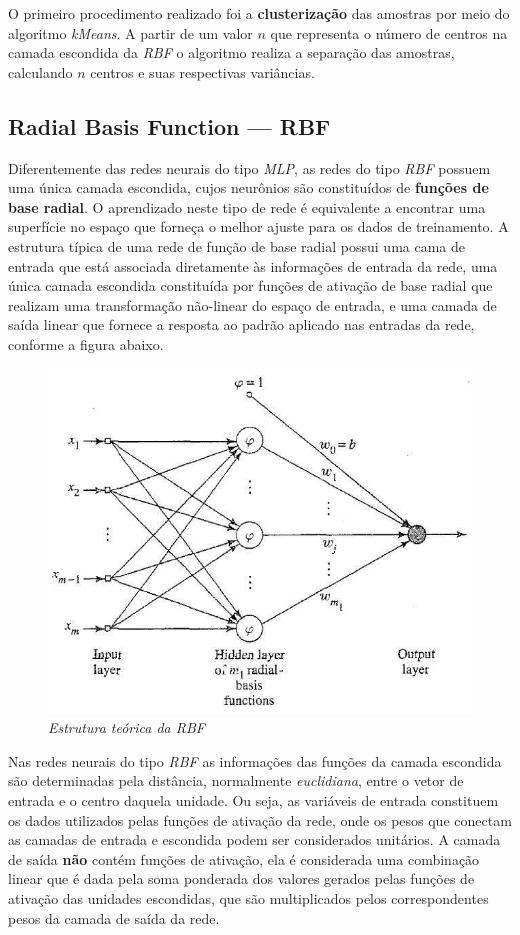 \documentclass[10pt,twocolumn,letterpaper]{article}
\begin{document}
O primeiro procedimento realizado foi a \textbf{clusterização} das amostras por meio do algoritmo \textit{kMeans}. A partir de um valor $n$ que representa o número de centros na camada escondida da \textit{RBF} o algoritmo realiza a separação das amostras, calculando $n$ centros e suas respectivas variâncias.

\subsection{Radial Basis Function --- RBF}
Diferentemente das redes neurais do tipo \textit{MLP}, as redes do tipo \textit{RBF} possuem uma única camada escondida, cujos neurônios são constituídos de \textbf{funções de base radial}. O aprendizado neste tipo de rede é equivalente a encontrar uma superfície no espaço que forneça o melhor ajuste para os dados de treinamento. A estrutura típica de uma rede de função de base radial possui uma cama de entrada que está associada diretamente às informações de entrada da rede, uma única camada escondida constituída por funções de ativação de base radial que realizam uma transformação não-linear do espaço de entrada, e uma camada de saída linear que fornece a resposta ao padrão aplicado nas entradas da rede, conforme a figura abaixo.~\cite{livro2}
\begin{figure}[h]
\begin{center}
\includegraphics[scale=0.3]{foto1.jpg}
\caption{\textit{Estrutura teórica da RBF~\cite{livro2}}}
\end{center}
\end{figure}
Nas redes neurais do tipo \textit{RBF} as informações das funções da camada escondida são determinadas pela distância, normalmente \textit{euclidiana}, entre o vetor de entrada e o centro daquela unidade. Ou seja, as variáveis de entrada constituem os dados utilizados pelas funções de ativação da rede, onde os pesos que conectam as camadas de entrada e escondida podem ser considerados unitários.
A camada de saída \textbf{não} contém funções de ativação, ela é considerada uma combinação linear que é dada pela soma ponderada dos valores gerados pelas funções de ativação das unidades escondidas, que são multiplicados pelos correspondentes pesos da camada de saída da rede.
\end{document}
